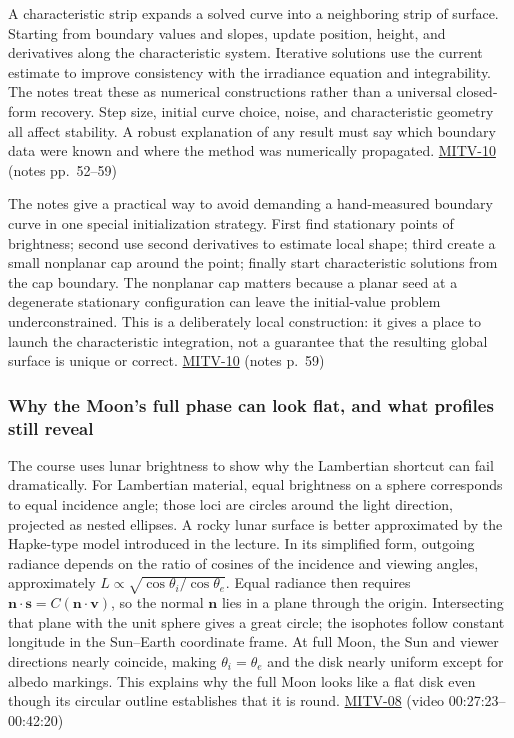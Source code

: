 A characteristic strip expands a solved curve into a neighboring strip of surface. Starting from boundary values and slopes, update position, height, and derivatives along the characteristic system. Iterative solutions use the current estimate to improve consistency with the irradiance equation and integrability. The notes treat these as numerical constructions rather than a universal closed-form recovery. Step size, initial curve choice, noise, and characteristic geometry all affect stability. A robust explanation of any result must say which boundary data were known and where the method was numerically propagated. \hyperref[04-visual-computing-ii-ch036]{MITV-10} (notes pp.~52--59)

The notes give a practical way to avoid demanding a hand-measured boundary curve in one special initialization strategy. First find stationary points of brightness; second use second derivatives to estimate local shape; third create a small nonplanar cap around the point; finally start characteristic solutions from the cap boundary. The nonplanar cap matters because a planar seed at a degenerate stationary configuration can leave the initial-value problem underconstrained. This is a deliberately local construction: it gives a place to launch the characteristic integration, not a guarantee that the resulting global surface is unique or correct. \hyperref[04-visual-computing-ii-ch036]{MITV-10} (notes p.~59)

\subsubsection{Why the Moon's full phase can look flat, and what profiles still reveal}\label{why-the-moons-full-phase-can-look-flat-and-what-profiles-still-reveal}

The course uses lunar brightness to show why the Lambertian shortcut can fail dramatically. For Lambertian material, equal brightness on a sphere corresponds to equal incidence angle; those loci are circles around the light direction, projected as nested ellipses. A rocky lunar surface is better approximated by the Hapke-type model introduced in the lecture. In its simplified form, outgoing radiance depends on the ratio of cosines of the incidence and viewing angles, approximately \(L\propto\sqrt{\cos\theta_i/\cos\theta_e}\). Equal radiance then requires \(\mathbf n\cdot\mathbf s=C(\mathbf n\cdot\mathbf v)\), so the normal \(\mathbf n\) lies in a plane through the origin. Intersecting that plane with the unit sphere gives a great circle; the isophotes follow constant longitude in the Sun--Earth coordinate frame. At full Moon, the Sun and viewer directions nearly coincide, making \(\theta_i=\theta_e\) and the disk nearly uniform except for albedo markings. This explains why the full Moon looks like a flat disk even though its circular outline establishes that it is round. \hyperref[04-visual-computing-ii-ch036]{MITV-08} (video 00:27:23--00:42:20)

